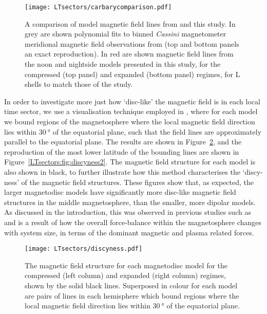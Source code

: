 \begin{figure}
\centering
\texttt{[image: LTsectors/carbarycomparison.pdf]}
\caption[Model magnetic field lines for the dayside and nightside, for the compressed and expanded regimes, compared to \citet{carbary2018} results.]{A comparison of model magnetic field lines from \citet{carbary2018} and this study. In grey are shown polynomial fits to binned \textit{Cassini} magnetometer meridional magnetic field observations from \citet{carbary2018} (top and bottom panels an exact reproduction). In red are shown magnetic field lines from the noon and nightside models presented in this study, for the compressed (top panel) and expanded (bottom panel) regimes, for L shells to match those of the \citet{carbary2018} study.}
\label{LTsectors:fig:carbarycomparison}
\end{figure}

In order to investigate more just how `disc-like' the magnetic field is in each local time sector, we use a visualisation technique employed in \citet{bunce2008}, where for each model we bound regions of the magnetosphere where the local magnetic field direction lies within $\SI{30}{\degree}$ of the equatorial plane, such that the field lines are approximately parallel to the equatorial plane. The results are shown in Figure~\ref{LTsectors:fig:discyness}, and the reproduction of the most lower latitude of the bounding lines are shown in Figure~\ref{LTsectors:fig:discyness2}. The magnetic field structure for each model is also shown in black, to further illustrate how this method characterises the `discy-ness' of the magnetic field structures. These figures show that, as expected, the larger magnetodisc models have significantly more disc-like magnetic field structures in the middle magnetosphere, than the smaller, more dipolar models. As discussed in the introduction, this was observed in previous studies such as \citet{arridge2008,achilleos2010a,sorba2017} and is a result of how the overall force-balance within the magnetosphere changes with system size, in terms of the dominant magnetic and plasma related forces. 

\begin{figure}
\centering
\texttt{[image: LTsectors/discyness.pdf]}
\caption[Model magnetic field structures for different local time sectors, with bounding lines showing regions where the magnetic field direction is within $\SI{30}{\degree}$ of the equatorial plane.]{The magnetic field structure for each magnetodisc model for the compressed (left column) and expanded (right column) regimes, shown by the solid black lines. Superposed in colour for each model are pairs of lines in each hemisphere which bound regions where the local magnetic field direction lies within $\SI{30}{\degree}$ of the equatorial plane.}
\label{LTsectors:fig:discyness}
\end{figure}

